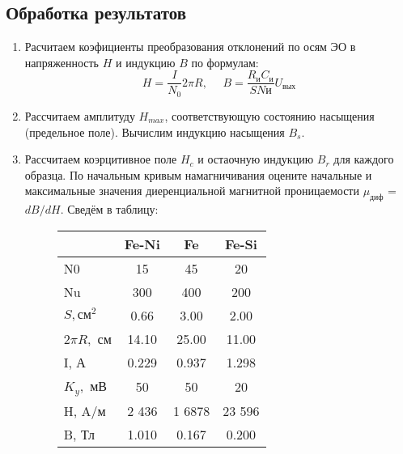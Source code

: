 \documentclass[14pt,a4paper]{article}
\begin{document}
\subsection*{Обработка результатов}
\begin{enumerate}
  \item Расчитаем коэфициенты преобразования отклонений по осям ЭО в напряженность $H$ и индукцию $B$ по формулам:
  $$H = \frac{I}{N_0}{2\pi R}, \ \ \ \ \ \ B = \frac{R_\text{и}C_\text{и}}{SN\text{и}}U_\text{вых}$$
  \item Рассчитаем амплитуду
  $H_{max}$, соответствующую состоянию насыщения (предельное поле). Вычислим индукцию насыщения $B_s$.
  \item Рассчитаем коэрцитивное поле $H_c$ и остаочную индукцию $B_r$ для каждого образца. По начальным кривым намагничивания оцените начальные и максимальные
значения диеренциальной магнитной проницаемости $\mu_\text{диф}$ = $dB/dH$.
  Сведём в таблицу:
  \begin{figure}[H]
    \begin{tabular}{l|ccc}
      {} &        Fe-Ni &            Fe &         Fe-Si \\
      \midrule
      N0  &    15 &     45 &     20 \\
      Nu  &   300 &    400 &    200 \\
      $S, \text{см}^2$   &     0.66 &      3.00 &      2.00 \\
      $2\pi R,$ см &     14.10 &      25.00 &      11.00 \\
      I, А   &     0.229 &      0.937 &      1.298 \\
      $K_y,$ мВ  &     50 &      50 &      20 \\
      H, A/м   &  2 436 &  1 6878 &  23 596 \\
      B, Тл   &     1.010 &      0.167 &      0.200 \\
      \end{tabular}
  \end{figure}
\end{enumerate}
\end{document}
